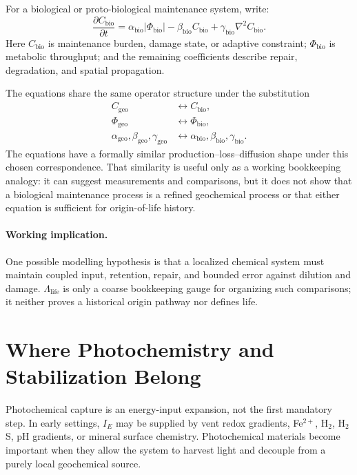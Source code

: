 \documentclass[11pt,a4paper]{article}
\begin{document}
For a biological or proto-biological maintenance system, write:
\begin{equation}
 \frac{\partial C_{\mathrm{bio}}}{\partial t}
 =
 \alpha_{\mathrm{bio}}|\Phi_{\mathrm{bio}}|
 -\beta_{\mathrm{bio}}C_{\mathrm{bio}}
 +\gamma_{\mathrm{bio}}\nabla^2C_{\mathrm{bio}}.
\end{equation}
Here $C_{\mathrm{bio}}$ is maintenance burden, damage state, or adaptive constraint; $\Phi_{\mathrm{bio}}$ is metabolic throughput; and the remaining coefficients describe repair, degradation, and spatial propagation.

The equations share the same operator structure under the substitution
\begin{align*}
 C_{\mathrm{geo}} &\leftrightarrow C_{\mathrm{bio}},\\
 \Phi_{\mathrm{geo}} &\leftrightarrow \Phi_{\mathrm{bio}},\\
 \alpha_{\mathrm{geo}},\beta_{\mathrm{geo}},\gamma_{\mathrm{geo}}
 &\leftrightarrow
 \alpha_{\mathrm{bio}},\beta_{\mathrm{bio}},\gamma_{\mathrm{bio}}.
\end{align*}
The equations have a formally similar production--loss--diffusion shape under
this chosen correspondence. That similarity is useful only as a working
bookkeeping analogy: it can suggest measurements and comparisons, but it does
not show that a biological maintenance process is a refined geochemical
process or that either equation is sufficient for origin-of-life history.

\paragraph{Working implication.}
One possible modelling hypothesis is that a localized chemical system must
maintain coupled input, retention, repair, and bounded error against dilution
and damage. $\Lambda_{\mathrm{life}}$ is only a coarse bookkeeping gauge for
organizing such comparisons; it neither proves a historical origin pathway nor
defines life.

\section{Where Photochemistry and Stabilization Belong}

Photochemical capture is an energy-input expansion, not the first mandatory step. In early settings, $I_E$ may be supplied by vent redox gradients, Fe$^{2+}$, H$_2$, H$_2$S, pH gradients, or mineral surface chemistry. Photochemical materials become important when they allow the system to harvest light and decouple from a purely local geochemical source.
\end{document}
